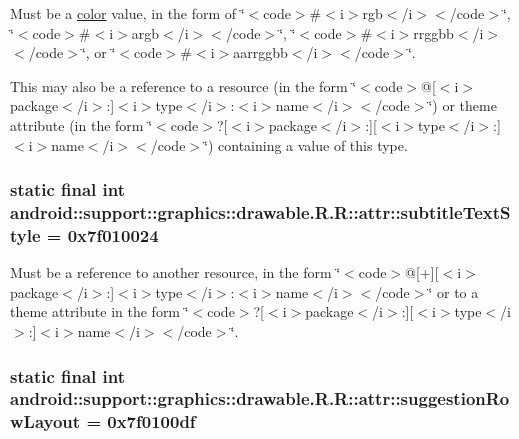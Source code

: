 Must be a \hyperlink{classandroid_1_1support_1_1graphics_1_1drawable_1_1_r_1_1color}{color} value, in the form of \char`\"{}$<$code$>$\#$<$i$>$rgb$<$/i$>$$<$/code$>$\char`\"{}, \char`\"{}$<$code$>$\#$<$i$>$argb$<$/i$>$$<$/code$>$\char`\"{}, \char`\"{}$<$code$>$\#$<$i$>$rrggbb$<$/i$>$$<$/code$>$\char`\"{}, or \char`\"{}$<$code$>$\#$<$i$>$aarrggbb$<$/i$>$$<$/code$>$\char`\"{}. 

This may also be a reference to a resource (in the form \char`\"{}$<$code$>$@\mbox{[}$<$i$>$package$<$/i$>$:\mbox{]}$<$i$>$type$<$/i$>$:$<$i$>$name$<$/i$>$$<$/code$>$\char`\"{}) or theme attribute (in the form \char`\"{}$<$code$>$?\mbox{[}$<$i$>$package$<$/i$>$:\mbox{]}\mbox{[}$<$i$>$type$<$/i$>$:\mbox{]}$<$i$>$name$<$/i$>$$<$/code$>$\char`\"{}) containing a value of this type. \hypertarget{classandroid_1_1support_1_1graphics_1_1drawable_1_1_r_1_1attr_9f3f0885a6c4df766786236282993b01}{
\subsubsection[{subtitleTextStyle}]{\setlength{\rightskip}{0pt plus 5cm}static final int android::support::graphics::drawable.R.R::attr::subtitleTextStyle = 0x7f010024}}
\label{classandroid_1_1support_1_1graphics_1_1drawable_1_1_r_1_1attr_9f3f0885a6c4df766786236282993b01}


Must be a reference to another resource, in the form \char`\"{}$<$code$>$@\mbox{[}+\mbox{]}\mbox{[}$<$i$>$package$<$/i$>$:\mbox{]}$<$i$>$type$<$/i$>$:$<$i$>$name$<$/i$>$$<$/code$>$\char`\"{} or to a theme attribute in the form \char`\"{}$<$code$>$?\mbox{[}$<$i$>$package$<$/i$>$:\mbox{]}\mbox{[}$<$i$>$type$<$/i$>$:\mbox{]}$<$i$>$name$<$/i$>$$<$/code$>$\char`\"{}. \hypertarget{classandroid_1_1support_1_1graphics_1_1drawable_1_1_r_1_1attr_e8e10574116be9e11c358d75ff323616}{
\subsubsection[{suggestionRowLayout}]{\setlength{\rightskip}{0pt plus 5cm}static final int android::support::graphics::drawable.R.R::attr::suggestionRowLayout = 0x7f0100df}}
\label{classandroid_1_1support_1_1graphics_1_1drawable_1_1_r_1_1attr_e8e10574116be9e11c358d75ff323616}


